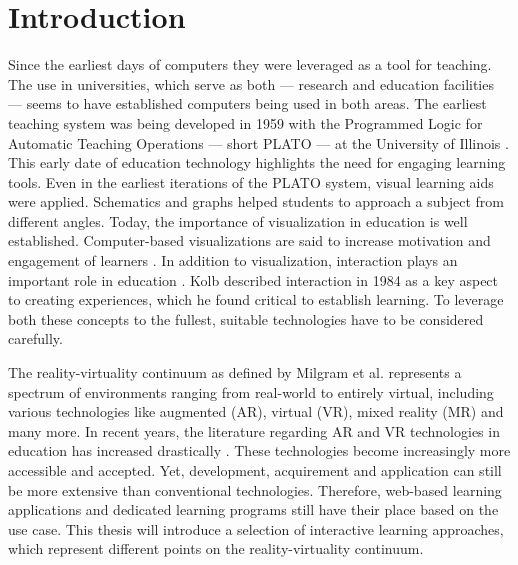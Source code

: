 %





\chapter{Introduction}
\label{sec:intro}


Since the earliest days of computers they were leveraged as a tool for teaching. The use in universities, which serve as both --- research and education facilities --- seems to have established computers being used in both areas. The earliest teaching system was being developed in 1959 with the Programmed Logic for Automatic Teaching Operations --- short PLATO --- at the University of Illinois \cite{cope2023history}. This early date of education technology highlights the need for engaging learning tools. Even in the earliest iterations of the PLATO system, visual learning aids were applied. Schematics and graphs helped students to approach a subject from different angles. Today, the importance of visualization in education is well established. Computer-based visualizations are said to increase motivation and engagement of learners \cite{vavra2011visualization}. In addition to visualization, interaction plays an important role in education \cite{firat2018towards}. Kolb described interaction in 1984 \cite{kolb:1984:experiential} as a key aspect to creating experiences, which he found critical to establish learning. To leverage both these concepts to the fullest, suitable technologies have to be considered carefully.

The reality-virtuality continuum as defined by Milgram et al. \cite{milgram1994arc} represents a spectrum of environments ranging from real-world to entirely virtual, including various technologies like augmented (AR), virtual (VR), mixed reality (MR) and many more. In recent years, the literature regarding AR and VR technologies in education has increased drastically \cite{alansi2023analyzing}. These technologies become increasingly more accessible and accepted. Yet, development, acquirement and application can still be more extensive than conventional technologies. Therefore, web-based learning applications and dedicated learning programs still have their place based on the use case. This thesis will introduce a selection of interactive learning approaches, which represent different points on the reality-virtuality continuum.

